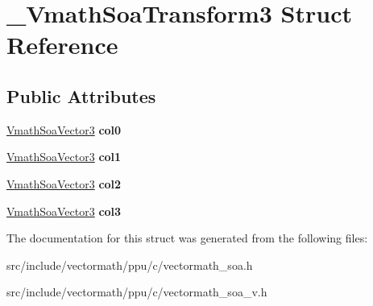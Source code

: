 \hypertarget{struct__VmathSoaTransform3}{\section{\-\_\-\-Vmath\-Soa\-Transform3 Struct Reference}
\label{struct__VmathSoaTransform3}
}
\subsection*{Public Attributes}
\begin{DoxyCompactItemize}
\item 
\hypertarget{struct__VmathSoaTransform3_a316194eccb33173ae415bf42a1e8cf5a}{\hyperlink{struct__VmathSoaVector3}{Vmath\-Soa\-Vector3} {\bfseries col0}}\label{struct__VmathSoaTransform3_a316194eccb33173ae415bf42a1e8cf5a}

\item 
\hypertarget{struct__VmathSoaTransform3_aa2069f9094e117799a3f6ebf197ec965}{\hyperlink{struct__VmathSoaVector3}{Vmath\-Soa\-Vector3} {\bfseries col1}}\label{struct__VmathSoaTransform3_aa2069f9094e117799a3f6ebf197ec965}

\item 
\hypertarget{struct__VmathSoaTransform3_a403765af832e882ab3053ecf6f7477c7}{\hyperlink{struct__VmathSoaVector3}{Vmath\-Soa\-Vector3} {\bfseries col2}}\label{struct__VmathSoaTransform3_a403765af832e882ab3053ecf6f7477c7}

\item 
\hypertarget{struct__VmathSoaTransform3_a8a0ea5310d50210c41d1addb55456f18}{\hyperlink{struct__VmathSoaVector3}{Vmath\-Soa\-Vector3} {\bfseries col3}}\label{struct__VmathSoaTransform3_a8a0ea5310d50210c41d1addb55456f18}

\end{DoxyCompactItemize}


The documentation for this struct was generated from the following files\-:\begin{DoxyCompactItemize}
\item 
src/include/vectormath/ppu/c/vectormath\-\_\-soa.\-h\item 
src/include/vectormath/ppu/c/vectormath\-\_\-soa\-\_\-v.\-h\end{DoxyCompactItemize}
